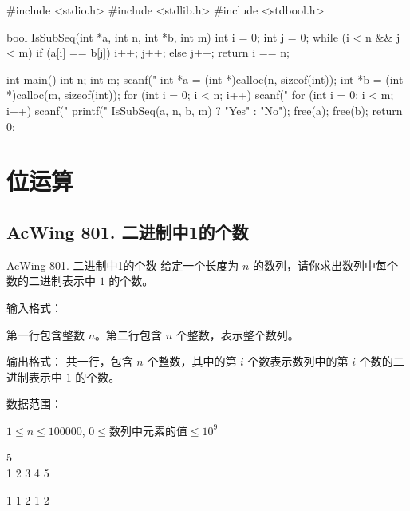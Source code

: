 \begin{mycpptwocol}[判断子序列]
    #include <stdio.h>
    #include <stdlib.h>
    #include <stdbool.h>

    bool IsSubSeq(int *a, int n, int *b, int m) {
        int i = 0;
        int j = 0;
        while (i < n && j < m) {
            if (a[i] == b[j]) {
                i++;
                j++;
            } else {
                j++;
            }
        }
        return i == n;
    }

    int main() {
        int n;
        int m;
        scanf("%
        int *a = (int *)calloc(n, sizeof(int));
        int *b = (int *)calloc(m, sizeof(int));
        for (int i = 0; i < n; i++) {
            scanf("%
        }
        for (int i = 0; i < m; i++) {
            scanf("%
        }
        printf("%
        IsSubSeq(a, n, b, m) ? "Yes" : "No");
        free(a);
        free(b);
        return 0;
    }
\end{mycpptwocol}


\section{位运算}

\subsection{AcWing 801. 二进制中1的个数}
\begin{titledbox}{AcWing 801. 二进制中1的个数}
    给定一个长度为 $n$ 的数列，请你求出数列中每个数的二进制表示中 $1$ 的个数。

    输入格式：

    第一行包含整数 $n$。第二行包含 $n$ 个整数，表示整个数列。

    输出格式：
    共一行，包含 $n$ 个整数，其中的第 $i$ 个数表示数列中的第 $i$ 个数的二进制表示中 $1$ 的个数。

    数据范围：

    $1 \le n \le 100000$, $0 \le \text{数列中元素的值} \le 10^9$

    \begin{inputblock}
        5 \\
        1 2 3 4 5
    \end{inputblock}
    \begin{outputblock}
        1 1 2 1 2
    \end{outputblock}
\end{titledbox}

